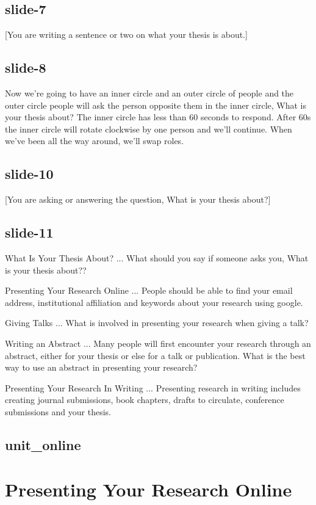 \documentclass[12pt,\papersize]{extarticle}
\begin{document}
\subsection{slide-7}
[You are writing a sentence or two on what your thesis is about.]
 
\subsection{slide-8}
Now we're going to have an inner circle and an outer circle of people and the outer circle people
will ask the person opposite them in the inner circle, What is your thesis about?
The inner circle has less than 60 seconds to respond.
After 60s the inner circle will rotate clockwise by one person and we'll continue.
When we've been all the way around, we'll swap roles.
 
\subsection{slide-10}
[You are asking or answering the question, What is your thesis about?]
 
\subsection{slide-11}
What Is Your Thesis About?
... What should you say if someone asks you, What is your thesis about??
 
Presenting Your Research Online
... People should be able to find your email address, institutional affiliation and keywords about your research using google.
 
Giving Talks
... What is involved in presenting your research when giving a talk?
 
Writing an Abstract
... Many people will first encounter your research through an abstract, either for your thesis or else for a talk or publication.  What is the best way to use an abstract in presenting your research?
 
Presenting Your Research In Writing
... Presenting research in writing includes creating journal submissions, book chapters, drafts to circulate, conference submissions and your thesis.
 
\subsection{unit\_online}
 
 
\section{Presenting Your Research Online}
 
\end{document}
